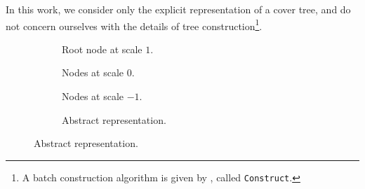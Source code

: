 In this work, we consider only the explicit representation of a cover tree, and
do not concern ourselves with the details of tree construction\footnote{A batch
construction algorithm is given by \citet{langford2006}, called
\texttt{Construct}.}.

\begin{figure}
\begin{subfigure}[b]{0.495\textwidth}
  \begin{center}
    \begin{tikzpicture}[scale=0.8]
      
      
    \end{tikzpicture}
  \end{center}
  \vspace*{-0.5em}
  \caption{Root node at scale $1$.}
  \label{fig:cover-tree-s1}
\end{subfigure}
\begin{subfigure}[b]{0.495\textwidth}
  \begin{center}
    \begin{tikzpicture}[scale=0.85]
      
      
    \end{tikzpicture}
  \end{center}
  \vspace*{-0.5em}
  \caption{Nodes at scale $0$.}
  \label{fig:cover-tree-s0}
\end{subfigure}
\begin{subfigure}[b]{0.355\textwidth}
  \begin{center}
    \begin{tikzpicture}[scale=0.85]
      
      
    \end{tikzpicture}
  \end{center}
  \vspace*{-0.5em}
  \caption{Nodes at scale $-1$.}
  \label{fig:cover-tree-s-1}
\end{subfigure}
\begin{subfigure}[b]{0.64\textwidth}
  \begin{center}
    \begin{tikzpicture}[scale=0.6]
      
    \end{tikzpicture}
  \end{center}
  \vspace*{-0.5em}
  \caption{Abstract representation.}
  \label{fig:cover-tree-ex}
\end{subfigure}

\end{figure}
